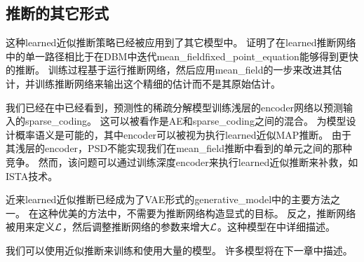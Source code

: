 \subsection{推断的其它形式}
\label{sec:other_forms_of_learned_inference}

这种\gls{learned}近似推断策略已经被应用到了其它模型中。
\citep{Salakhutdinov+Larochelle-2010}证明了在\gls{learned}推断网络中的单一路径相比于在\gls{DBM}中迭代\gls{mean_field}\gls{fixed_point_equation}能够得到更快的推断。
训练过程基于运行推断网络，然后应用\gls{mean_field}的一步来改进其估计，并训练推断网络来输出这个精细的估计而不是其原始估计。


我们已经在中已经看到，预测性的稀疏分解模型训练浅层的\gls{encoder}网络以预测输入的\gls{sparse_coding}。
这可以被看作是\gls{AE}和\gls{sparse_coding}之间的混合。
为模型设计概率语义是可能的，其中\gls{encoder}可以被视为执行\gls{learned}近似\gls{MAP}推断。
由于其浅层的\gls{encoder}，PSD不能实现我们在\gls{mean_field}推断中看到的单元之间的那种竞争。
然而，该问题可以通过训练深度\gls{encoder}来执行\gls{learned}近似推断来补救，如ISTA技术\citep{Gregor+LeCun-ICML2010}。


近来\gls{learned}近似推断已经成为了\gls{VAE}形式的\gls{generative_model}中的主要方法之一\citep{Kingma+Welling-ICLR2014,Rezende-et-al-ICML2014}。
在这种优美的方法中，不需要为推断网络构造显式的目标。
反之，推断网络被用来定义$\mathcal{L}$，然后调整推断网络的参数来增大$\mathcal{L}$。这种模型在中详细描述。

我们可以使用近似推断来训练和使用大量的模型。
许多模型将在下一章中描述。















